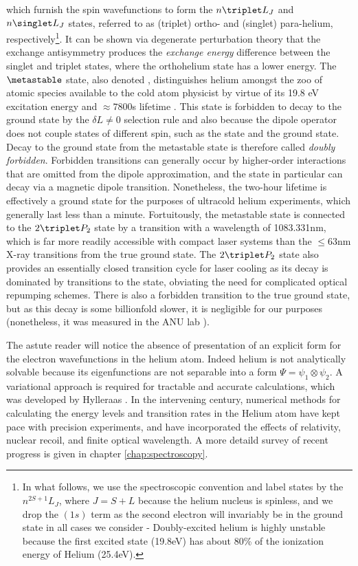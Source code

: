 	which furnish the spin wavefunctions to form the $n\triplet L_{J}$ and $n\singlet L_{J}$ states, referred to as (triplet) ortho- and (singlet) para-helium, respectively\footnote{In what follows, we use the spectroscopic convention and label states by the $n^{2S+1}L_J$, where $J=S+L$ because the helium nucleus is spinless, and we drop the $(1s)$ term as the second electron will invariably be in the ground state in all cases we consider -  Doubly-excited helium is highly unstable because the first excited state (19.8eV) has about 80\% of the ionization energy of Helium (25.4eV).}.
	It can be shown via degenerate perturbation theory that the exchange antisymmetry produces the \emph{exchange energy} difference between the singlet and triplet states, where the  orthohelium state has a lower energy.
	 The $\metastable$ state, also denoted \mhe, distinguishes helium amongst the zoo of atomic species available to the cold atom physicist by virtue of its 19.8 eV excitation energy and $\approx 7800$s lifetime \cite{Hodgman09}.
	 This state is forbidden to decay to the ground state by the $\delta L\neq0$ selection rule and also because the dipole operator does not couple states of different spin, such as the \mhe state and the ground state.
	Decay to the ground state from the metastable state is  therefore called \emph{doubly forbidden}.
	Forbidden transitions can generally occur by higher-order interactions that are omitted from the dipole approximation, and the \mhe state in particular can decay via a magnetic dipole transition.
	Nonetheless, the two-hour lifetime is effectively a ground state for the purposes of ultracold helium experiments, which generally last less than a minute.
	Fortuitously, the metastable state is connected to the $2\triplet P_2$ state by a transition with a wavelength of 1083.331nm, which is far more readily accessible with compact laser systems than the $\leq 63$nm X-ray transitions from the true ground state.
	The $2\triplet P_2$ state also provides an essentially closed transition cycle for laser cooling as its decay is dominated by transitions to the \mhe state, obviating the need for complicated optical repumping schemes.
	There is also a forbidden transition to the true ground state, but as this decay is some billionfold slower, it is negligible for our purposes (nonetheless, it was measured in the ANU lab \cite{Hodgman09_23P}).

	The astute reader will notice the absence of presentation of an explicit form for the electron wavefunctions in the helium atom.
	Indeed	helium is not analytically solvable because its eigenfunctions are not separable into a form $\Psi = \psi_1\otimes\psi_2$.
	A variational approach is required for tractable and accurate calculations, which was developed by Hylleraas \cite{Hylleraas1920,Hylleraas1929,Hylleraas1930}.
	In the intervening century, numerical methods for calculating the energy levels and transition rates in the Helium atom have kept pace with precision experiments, and have incorporated the effects of relativity, nuclear recoil, and finite optical wavelength. A more detaild survey of recent progress is given in chapter \ref{chap:spectroscopy}.

